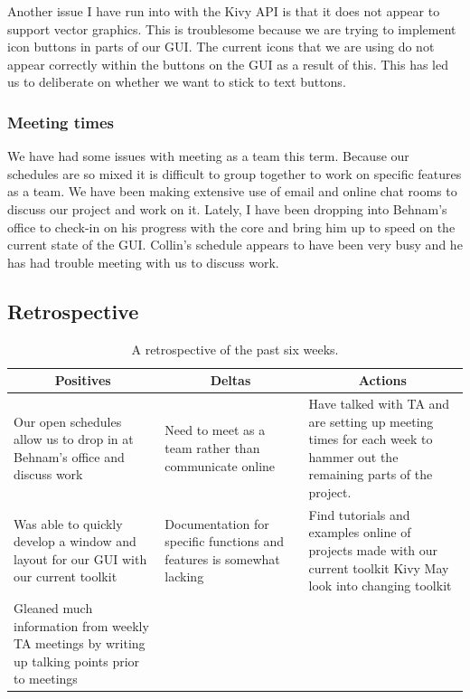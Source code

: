 \documentclass[journal,10pt,onecolumn,compsoc]{IEEEtran} \usepackage[margin=1.0in]{geometry} \usepackage{pdfpages}
\begin{document}
\noindent Another issue I have run into with the Kivy API is that it does not appear to support vector graphics. 
This is troublesome because we are trying to implement icon buttons in parts of our GUI.
The current icons that we are using do not appear correctly within the buttons on the GUI as a result of this. 
This has led us to deliberate on whether we want to stick to text buttons.
\subsubsection{Meeting times}
We have had some issues with meeting as a team this term. 
Because our schedules are so mixed it is difficult to group together to work on specific features as a team. 
We have been making extensive use of email and online chat rooms to discuss our project and work on it.
Lately, I have been dropping into Behnam's office to check-in on his progress with the core and bring him up to speed on the current state of the GUI. 
Collin's schedule appears to have been very busy and he has had trouble meeting with us to discuss work.


\subsection{Retrospective}

\begin{table}[H]
\begin{center}
 \begin{tabular}{ |p{}|p{}|p{}|} 
 \hline
 \multicolumn{1}{|c|}{\textbf{Positives}} 
 & 
\multicolumn{1}{|c|}{\textbf{Deltas}}  & 
\multicolumn{1}{|c|}{\textbf{Actions}}\\
 \hline
 
Our open schedules allow us to drop in at Behnam's office and discuss work & Need to meet as a team rather than communicate online & Have talked with TA and are setting up meeting times for each week to hammer out the remaining parts of the project.\\
 \hline
 
Was able to quickly develop a window and layout for our GUI with our current toolkit & Documentation for specific functions and features is somewhat lacking &  Find tutorials and examples online of projects made with our current toolkit Kivy \newline May look into changing toolkit  \\
 \hline
 
Gleaned much information from weekly TA meetings by writing up talking points prior to meetings & & \\
 \hline
 
 \hline
\end{tabular}
\caption{A retrospective of the past six weeks.}
\label{table:1}
\end{center}
\end{table}
\end{document}
